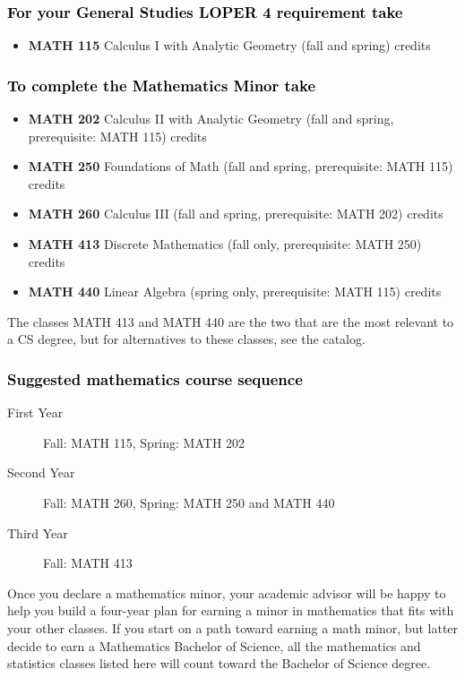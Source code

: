 \documentclass[10pt]{article}
\newenvironment{mypar}[2]
   {\begin{list}{}%
     {\setlength\leftmargin{#1}
     \setlength\rightmargin{#2}}
     \item[]}
   {\end{list}}
\newcommand{\calcone}{\textbf{MATH 115} Calculus I with Analytic Geometry (fall and spring) \dotfill 5 credits}
\newcommand{\calctwo}{\textbf{MATH 202} Calculus II with Analytic Geometry (fall and spring, prerequisite: MATH 115) \dotfill 5 credits }
\newcommand{\foundations}{\textbf{MATH 250} Foundations of Math (fall and spring, prerequisite: MATH 115)  \dotfill 3 credits}
\newcommand{\calcthree}{\textbf{MATH 260} Calculus III  (fall and spring, prerequisite: MATH 202) \dotfill 5 credits}
\newcommand{\linear}{\textbf{MATH 440} Linear Algebra (spring only, prerequisite: MATH 115) \dotfill 3 credits}
\newcommand{\discrete}{\textbf{MATH 413} Discrete Mathematics  (fall only, prerequisite: MATH 250)\dotfill 3 credits}
\begin{document}
\subsubsection*{\textcolor{black}{For  your General Studies LOPER 4 requirement take}}
\begin{itemize}
\item  \calcone
\end{itemize}

\subsubsection*{\textcolor{black}{To complete the Mathematics Minor take}}

\begin{itemize}
\item \calctwo
\item \foundations
\item \calcthree
\item \discrete
\item \linear
\end{itemize}
\begin{mypar}{0.5cm}{0.5cm}{The classes MATH 413 and MATH 440 are the two that are the most relevant to a CS degree, but for alternatives to these classes, see the catalog.} \end{mypar}

\vspace{-0.1in}
\subsubsection*{\textcolor{black}{Suggested mathematics course sequence}}

\begin{description}
   \item[\phantom{xxx} First Year] Fall: MATH 115, Spring:  MATH 202
      \item[\phantom{xxx} Second Year]  Fall: MATH 260,  Spring: MATH 250  and MATH 440
     \item[\phantom{xxx} Third Year]  Fall: MATH 413
 \end{description}
Once you declare a mathematics minor, your academic advisor will be happy to help you build a four-year plan for earning a minor in mathematics that fits with your other classes.  If you start on a path toward earning a math minor, but latter decide to earn a  Mathematics Bachelor of Science, all the mathematics and statistics  classes listed here will count toward the Bachelor of Science degree.
\end{document}
